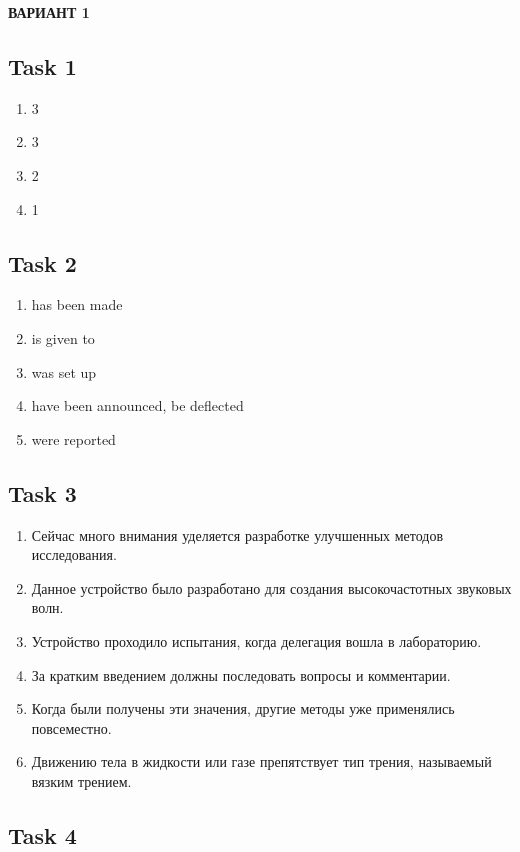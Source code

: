 \begin{center}
	\textbf{ВАРИАНТ 1}
\end{center}

\subsection*{Task 1}

\begin{enumerate}
	\item 3
	\item 3
	\item 2
	\item 1
\end{enumerate}

\subsection*{Task 2}

\begin{enumerate}
	\item has been made
	\item is given to
	\item was set up
	\item have been announced, be deflected
	\item were reported
\end{enumerate}

\subsection*{Task 3}

\begin{enumerate}
	\item Сейчас много внимания уделяется разработке улучшенных методов исследования.
	\item Данное устройство было разработано для создания высокочастотных звуковых волн.
	\item Устройство проходило испытания, когда делегация вошла в лабораторию.
	\item За кратким введением должны последовать вопросы и комментарии.
	\item Когда были получены эти значения, другие методы уже применялись повсеместно.
	\item Движению тела в жидкости или газе препятствует тип трения, называемый вязким трением.
\end{enumerate}

\subsection*{Task 4}

